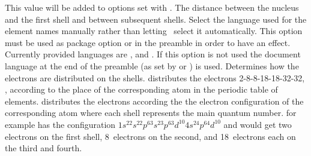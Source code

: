 \documentclass[load-preamble+]{cnltx-doc}
\begin{document}
\begin{options}
  \Default
    This value will be added to options set with .
  \Default{1em}
    The distance between the nucleus and the first shell and between subsequent
    shells.
  \Default
    Select the language used for the element names manually
    rather than letting \BOHR\ select it automatically.  This option must be
    used as package option or in the preamble in order to have an effect.
    Currently provided languages are ,  and
    .  If this option is not used the document language at the
    end of the preamble (as set by  or ) is
    used.
    Determines how the electrons are distributed on the
    shells.   distributes the electrons 2-8-8-18-18-32-32, \ie,
    according to the place of the corresponding atom in the periodic table of
    elements.   distributes the electrons according the the
    electron configuration of the corresponding atom where each shell
    represents the main quantum number.   for example has the
    configuration $1s^22s^22p^63s^23p^63d^{10}4s^24p^64d^{10}$ and would get
    two electrons on the first shell, 8~electrons on the second, and
    18~electrons each on the third and fourth.
\end{options}

\begin{example}
   
\end{example}

\begin{example}
   
\end{example}

\begin{example}
   
\end{example}
\end{document}
